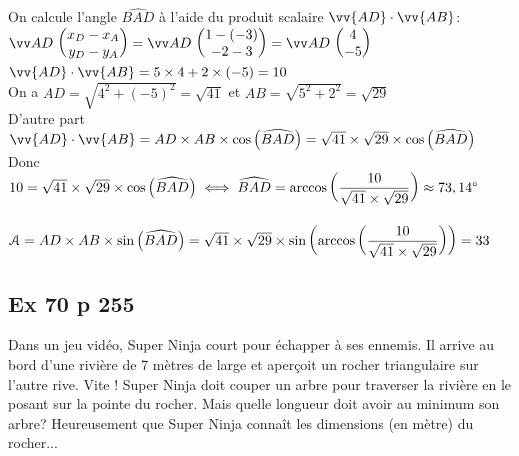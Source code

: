 \documentclass[12pt,a4paper]{book}
\begin{document}
\begin{enumMet}
\begin{corrBox}
		On calcule l'angle $\widehat{BAD}$ à l'aide du produit scalaire $\vv{AD}\cdot\vv{AB}$:
		$\Coord{AD}{x_D-x_A}{y_D-y_A}=\Coord{AD}{1-(-3)}{-2-3}=\Coord{AD}{4}{-5}$\\
		$\vv{AD}\cdot\vv{AB}=5\times 4+2\times (-5)=10$\\
		On a $AD= \sqrt{4^2+(-5)^2}=\sqrt{41}$ et $AB= \sqrt{5^2+2^2}=\sqrt{29}$ \\
		D'autre part $\vv{AD}\cdot\vv{AB}=AD\times AB\times \cos\left(\widehat{BAD}\right)=\sqrt{41}\times \sqrt{29}\times \cos\left(\widehat{BAD}\right)$\\
		Donc $10=\sqrt{41}\times \sqrt{29}\times \cos\left(\widehat{BAD}\right) \iff \widehat{BAD} = \arccos\left(\dfrac{10}{\sqrt{41}\times \sqrt{29}}\right)\approx73,14\degree$\\
		\ \\
		$\EuScript{A}=AD\times AB\times \sin\left(\widehat{BAD}\right)=\sqrt{41}\times \sqrt{29}\times \sin\left(\arccos\left(\dfrac{10}{\sqrt{41}\times \sqrt{29}}\right)\right)=33$
	\end{corrBox}
\end{enumMet}

\subsection*{Ex 70 p 255}

Dans un jeu vidéo, Super Ninja court pour échapper à ses ennemis. Il arrive au bord d'une rivière de 7 mètres de large et aperçoit un rocher triangulaire sur l'autre rive. Vite ! Super Ninja doit couper un arbre pour traverser la rivière en le posant sur la pointe du rocher. Mais quelle longueur doit avoir au minimum son arbre? Heureusement que Super Ninja connaît les dimensions (en mètre) du rocher...
\end{document}
